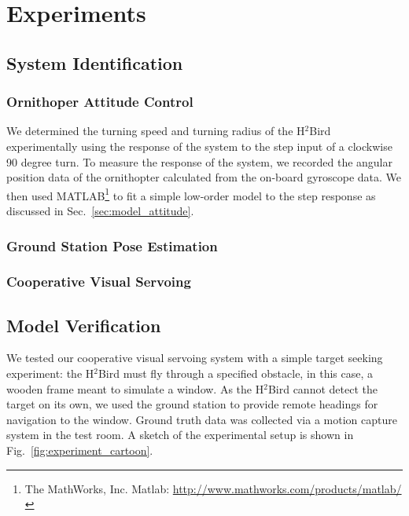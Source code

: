 \documentclass{aamas2013}
\begin{document}
\section{Experiments}

\subsection{System Identification}

\subsubsection{Ornithoper Attitude Control}

We determined the turning speed and turning radius of the H$^2$Bird
experimentally using the response of the system to the step input of a
clockwise 90 degree turn. To measure the response of the system, we recorded
the angular position data of the ornithopter calculated from the on-board
gyroscope data. We then used
MATLAB\footnote{The MathWorks, Inc. Matlab:
\href{http://www.mathworks.com/products/matlab/}
     {http://www.mathworks.com/products/matlab/}} to fit a
simple low-order model to the step response as discussed in Sec.~\ref{sec:model_attitude}.

\subsubsection{Ground Station Pose Estimation}

\subsubsection{Cooperative Visual Servoing}


\subsection{Model Verification}

We tested our cooperative visual servoing system with a simple target seeking
experiment: the H$^2$Bird must fly through a specified obstacle, in this case,
a wooden frame meant to simulate a window. As the H$^2$Bird cannot detect the
target on its own, we used the ground station to provide remote headings for
navigation to the window. Ground truth data was collected via a motion capture
system in the test room. A sketch of the experimental setup is shown in
Fig.~\ref{fig:experiment_cartoon}.
\end{document}
